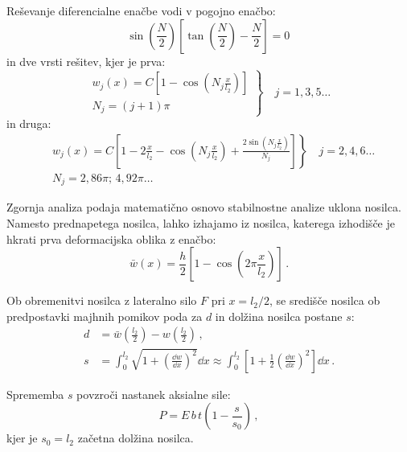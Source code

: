         Reševanje diferencialne enačbe vodi v pogojno enačbo:
        \begin{equation}
            \sin \left(\frac{N}{2}\right)\left[\tan \left(\frac{N}{2}\right)-\frac{N}{2}\right]=0 \,
        \end{equation}
        in dve vrsti rešitev, kjer je prva:
        \begin{equation}\label{eq:def_ob_1}
            \left.\begin{array}{l}
            w_j(x)=C\left[1-\cos \left(N_j \frac{x}{l_2}\right)\right] \\
            N_j=(j+1) \pi
            \end{array}\right\} \quad j = 1, 3, 5 \ldots
        \end{equation}
        in druga: 
        \begin{equation}\label{eq:def_obl_2}
            \begin{aligned}
            &\left.w_j(x)=C\left[1-2 \frac{x}{l_2}-\cos \left(N_j \frac{x}{l_2}\right)+\frac{2 \sin \left(N_j \frac{x}{l_2}\right)}{N_j}\right]\right\} \quad j=2, 4, 6 \ldots \\
            &N_j=2,86 \pi; \, 4,92 \pi \ldots
            \end{aligned}
        \end{equation}
        
        Zgornja analiza podaja matematično osnovo stabilnostne analize uklona nosilca. Namesto prednapetega nosilca, lahko izhajamo iz nosilca, katerega izhodišče je hkrati prva deformacijska oblika z enačbo:
        \begin{equation}
            \bar w(x)=\frac{h}{2}\left[1-\cos \left(2 \pi \frac{x}{l_2}\right)\right] \,.
        \end{equation}
        
        Ob obremenitvi nosilca z lateralno silo $F$ pri $x=l_2/2$, se središče nosilca ob predpostavki majhnih pomikov poda za $d$ in dolžina nosilca postane $s$: 
        \begin{align}\label{eq:dolzina_d}
            d &= \bar w \left(\frac{l_2}{2}\right)-w\left(\frac{l_2}{2}\right) \,, \\
            s &= \int_0^{l_2} \sqrt{1+\left(\frac{\dd w}{\dd x}\right)^2} \dd x \approx \int_0^{l_2}\left[1+\frac{1}{2}\left(\frac{\dd w}{\dd x}\right)^2\right] \dd x \,.
        \end{align}
        
        Sprememba $s$ povzroči nastanek aksialne sile: 
        \begin{equation}
            P = E \, b \, t \left(1 - \frac{s}{s_0}\right) \,,
        \end{equation}
        kjer je $s_0=l_2$ začetna dolžina nosilca. 
        
